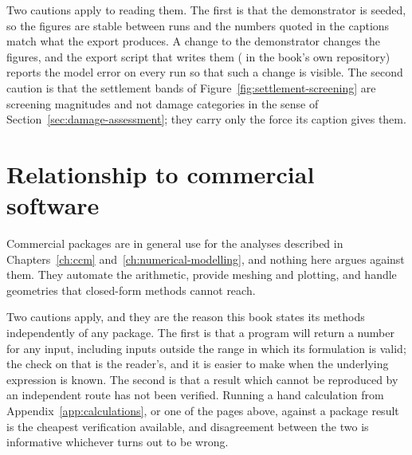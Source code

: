 Two cautions apply to reading them. The first is that the demonstrator is
seeded, so the figures are stable between runs and the numbers quoted in the
captions match what the export produces. A change to the demonstrator changes
the figures, and the
export script that writes them ( in the
book's own repository) reports the model error on every run so that such a
change is visible. The second caution is that the settlement
bands of Figure~\ref{fig:settlement-screening} are screening magnitudes and
not damage categories in the sense of Section~\ref{sec:damage-assessment};
they carry only the force its caption gives them.

\section{Relationship to commercial software}
\label{sec:commercial-software}

Commercial packages are in general use for the analyses described in
Chapters~\ref{ch:ccm} and~\ref{ch:numerical-modelling}, and nothing here argues
against them. They automate the arithmetic, provide meshing and plotting, and
handle geometries that closed-form methods cannot reach.

Two cautions apply, and they are the reason this book states its methods
independently of any package. The first is that a program will return a number
for any input, including inputs outside the range in which its formulation is
valid; the check on that is the reader's, and it is easier to make when the
underlying expression is known. The second is that a result which cannot be
reproduced by an independent route has not been verified. Running a hand
calculation from Appendix~\ref{app:calculations}, or one of the pages above,
against a package result is the cheapest verification available, and
disagreement between the two is informative whichever turns out to be wrong.

\chapterreferences
